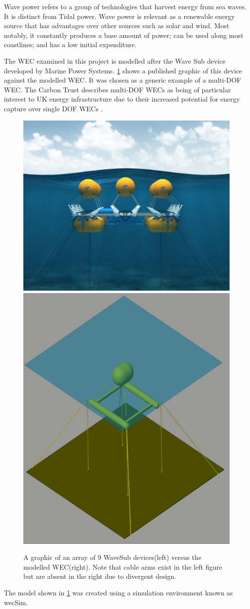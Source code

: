 \documentclass{report}
\begin{document}
Wave power refers to a group of technologies that harvest energy from sea waves. It is distinct from Tidal power. Wave power is relevant as a renewable energy source that has advantages over other sources such as solar and wind. Most notably, it constantly produces a base amount of power; can be used along most coastlines; and has a low initial expenditure. \cite{carbonTrust}

The WEC examined in this project is modelled after the Wave Sub device developed by Marine Power Systems\cite{waveSub}. \ref{fig:waveSub} shows a published graphic\cite{waveSub} of this device against the modelled WEC. It was chosen as a generic example of a multi-DOF WEC. The Carbon Trust describes multi-DOF WECs as being of particular interest to UK energy infrastructure due to their increased potential for energy capture over single DOF WECs \cite{carbonTrust}.



\begin{figure}
\centering
\includegraphics[height=0.4\textwidth]{graphics/waveSub}
\includegraphics[height=0.4\textwidth]{graphics/wecSimFloat}
\label{fig:waveSub}
\caption{A graphic of an array of 9 WaveSub devices(left)\cite{waveSub} versus the modelled WEC(right). Note that cable arms exist in the left figure but are absent in the right due to divergent design.}
\end{figure}

The model shown in \ref{fig:waveSub}  was created using a simulation environment known as wecSim\cite{wecSim}.
 
\end{document}
